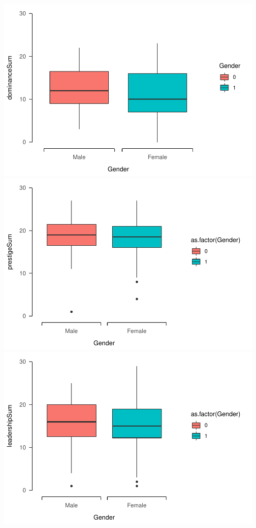 \documentclass[
  english,
  man]{apa6}
\begin{document}
\includegraphics{DoPL-Experiment_files/figure-latex/unnamed-chunk-3-1.pdf} \includegraphics{DoPL-Experiment_files/figure-latex/unnamed-chunk-3-2.pdf} \includegraphics{DoPL-Experiment_files/figure-latex/unnamed-chunk-3-3.pdf}
\end{document}
